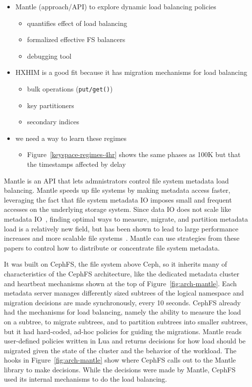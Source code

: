 \begin{itemize}
  \item Mantle (approach/API) to explore dynamic load balancing policies
  \begin{itemize}
    \item quantifies effect of load balancing
    \item formalized effective FS balancers
    \item debugging tool 
  \end{itemize}
  \item HXHIM is a good fit because it has migration mechanisms for load balancing
  \begin{itemize}
    \item bulk operations (\texttt{put/get()})
    \item key partitioners
    \item secondary indices
  \end{itemize}
  \item we need a way to learn these regimes
  \begin{itemize}
    \item Figure~\ref{keyspace-regimes-4hr} shows the same phases as 100K but that the timestamps affected by delay
  \end{itemize}
\end{itemize}

Mantle is an API that lets admnistrators control file system metadata load
balancing. Mantle speeds up file systems by making metadata access faster,
leveraging the fact that file system metadata IO imposes small and frequent
accesses on the underlying storage system. Since data IO does not scale like
metadata IO~\cite{roselli:atec2000-FS-workloads}, finding optimal ways to
measure, migrate, and partition metadata load is a relatively new field, but
has been shown to lead to large performance increases and more scalable file
systems~\cite{zheng:pdsw2014-batchfs, grider:pdsw2015-marfs,
ren:sc2014-indexfs, patil:fast2011-giga+, brandt:msst2003-lh}.  Mantle can use
strategies from these papers to control how to distribute or concentrate file
system metadata.

It was built on CephFS, the file system above Ceph, so it inherits many of
characteristics of the CephFS architecture, like the dedicated metadata cluster
and heartbeat mechanisms shown at the top of Figure~\ref{fig:arch-mantle}.
Each metadata server manages differently sized subtrees of the logical
namespace and migration decisions are made synchronously, every 10 seconds.
CephFS already had the mechanisms for load balancing, namely the ability to
measure the load on a subtree, to migrate subtrees, and to partition subtrees
into smaller subtrees, but it had hard-coded, ad-hoc policies for guiding the
migrations.  Mantle reads user-defined policies written in Lua and returns
decisions for how load should be migrated given the state of the cluster and
the behavior of the workload. The hooks in Figure~\ref{fig:arch-mantle} show
where CephFS calls out to the Mantle library to make decisions. While the
decisions were made by Mantle, CephFS used its internal mechanisms to do the
load balancing.


